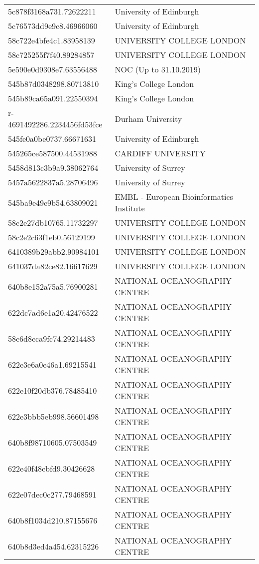 \begin{tabular}{ll}
5c878f3168a731.72622211 & University of Edinburgh \\
5c76573dd9e9c8.46966060 & University of Edinburgh \\
58c722e4bfe4c1.83958139 & UNIVERSITY COLLEGE LONDON \\
58c725255f7f40.89284857 & UNIVERSITY COLLEGE LONDON \\
5e590e0d9308e7.63556488 & NOC (Up to 31.10.2019) \\
545b87d0348298.80713810 & King's College London \\
545b89ca65a091.22550394 & King's College London \\
r-4691492286.2234456fd53fce & Durham University \\
545fe0a0be0737.66671631 & University of Edinburgh \\
545265ce587500.44531988 & CARDIFF UNIVERSITY \\
5458d813c3b9a9.38062764 & University of Surrey \\
5457a5622837a5.28706496 & University of Surrey \\
545ba9e49e9b54.63809021 & EMBL - European Bioinformatics Institute \\
58c2e27db10765.11732297 & UNIVERSITY COLLEGE LONDON \\
58c2e2c63f1eb0.56129199 & UNIVERSITY COLLEGE LONDON \\
6410389b29abb2.90984101 & UNIVERSITY COLLEGE LONDON \\
641037da82ce82.16617629 & UNIVERSITY COLLEGE LONDON \\
640b8e152a75a5.76900281 & NATIONAL OCEANOGRAPHY CENTRE \\
622dc7ad6e1a20.42476522 & NATIONAL OCEANOGRAPHY CENTRE \\
58c6d8cca9fc74.29214483 & NATIONAL OCEANOGRAPHY CENTRE \\
622e3e6a0e46a1.69215541 & NATIONAL OCEANOGRAPHY CENTRE \\
622e10f20db376.78485410 & NATIONAL OCEANOGRAPHY CENTRE \\
622e3bbb5eb998.56601498 & NATIONAL OCEANOGRAPHY CENTRE \\
640b8f98710605.07503549 & NATIONAL OCEANOGRAPHY CENTRE \\
622e40f48cbfd9.30426628 & NATIONAL OCEANOGRAPHY CENTRE \\
622e07dec0c277.79468591 & NATIONAL OCEANOGRAPHY CENTRE \\
640b8f1034d210.87155676 & NATIONAL OCEANOGRAPHY CENTRE \\
640b8d3ed4a454.62315226 & NATIONAL OCEANOGRAPHY CENTRE \\

\end{tabular}
